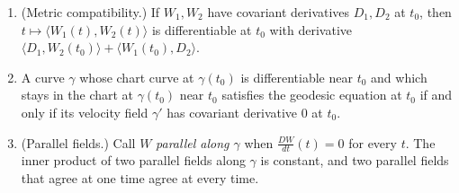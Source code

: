 \begin{lemma}
\begin{enumerate}
$$=\partial_{v}\widehat Z(u(t_0))
+\Gamma\bigl(v,Z(\gamma(t_0))\bigr)(u(t_0)),
\qquad v=\dot u(t_0),$$
where $\widehat Z$ is the coordinate representation of $Z$ in the chart at
$\gamma(t_0)$. This value is the Levi-Civita covariant derivative of $Z$
in the direction of the velocity: for every smooth vector field $X$ on $M$
with $X(\gamma(t_0))=v$,
$$\frac{D(Z\circ\gamma)}{dt}(t_0)=\bigl(\nabla_XZ\bigr)(\gamma(t_0));$$
equivalently, at the centre $x$ of its own chart,
$$(\nabla_XZ)(x)=\partial_{X(x)}\widehat Z(\varphi(x))
+\Gamma\bigl(X(x),Z(x)\bigr)(\varphi(x)),$$
so that $(\nabla_XZ)(x)$ depends on $X$ only through $X(x)$. In
particular, a smooth field $Z$ with $\nabla Z\equiv0$ restricts to a
parallel field (in the sense of item (4)) along every curve that satisfies
the standing chart-regularity hypotheses at each time.
\item (Metric compatibility.) If $W_1,W_2$ have covariant derivatives
$D_1,D_2$ at $t_0$, then $t\mapsto\langle W_1(t),W_2(t)\rangle$ is
differentiable at $t_0$ with derivative
$\langle D_1,W_2(t_0)\rangle+\langle W_1(t_0),D_2\rangle$.
\item A curve $\gamma$ whose chart curve at $\gamma(t_0)$ is differentiable
near $t_0$ and which stays in the chart at $\gamma(t_0)$ near $t_0$
satisfies the geodesic equation at $t_0$ if and only if its velocity field
$\gamma'$ has covariant derivative $0$ at $t_0$.
\item (Parallel fields.) Call $W$ \emph{parallel along $\gamma$} when
$\frac{DW}{dt}(t)=0$ for every $t$. The inner product of two parallel
fields along $\gamma$ is constant, and two parallel fields that agree at
one time agree at every time.
\end{enumerate}
\end{lemma}

